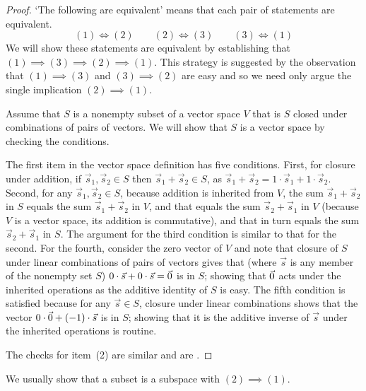 \begin{proof}
`The following are equivalent' means that each pair of 
statements are equivalent.
\begin{equation*}
  (1)\!\iff\!(2)
  \qquad
  (2)\!\iff\!(3)
  \qquad
  (3)\!\iff\!(1)
\end{equation*}
We will show these statements are equivalent by establishing that
\( (1)\implies (3)\implies (2)\implies (1)\).
This strategy is suggested by the observation that
\( (1)\implies (3) \) and \( (3)\implies (2) \) are easy and so we need only
argue the single implication \( (2)\implies (1) \).

Assume that \( S \) is a nonempty subset of a vector space
$V$ that is $S$ closed under combinations of pairs of vectors.
We will show that $S$ is a vector space by checking the conditions.

The first item in the vector space definition has five conditions.
First, for closure under addition, if
\( \vec{s}_1,\vec{s}_2\in S \) then \( \vec{s}_1+\vec{s}_2\in S \),
as \( \vec{s}_1+\vec{s}_2=1\cdot\vec{s}_1+1\cdot\vec{s}_2 \).
Second, for any \( \vec{s}_1,\vec{s}_2\in S \), because addition
is inherited from \( V \), the sum \( \vec{s}_1+\vec{s}_2 \)
in \( S \) equals the sum \( \vec{s}_1+\vec{s}_2 \)
in \( V \), and that equals the sum \( \vec{s}_2+\vec{s}_1 \) in
\( V \) (because $V$ is a vector space, its addition is commutative), 
and that in turn equals the sum \( \vec{s}_2+\vec{s}_1 \) in \( S \).
The argument for the third condition is similar to that for the second.
For the fourth, consider the zero vector of \( V \) and note that 
closure of $S$ under linear combinations of pairs of vectors gives that 
(where \( \vec{s} \) is any member of the nonempty set \( S \))
\( 0\cdot\vec{s}+0\cdot\vec{s}=\vec{0} \) is in $S$;
showing that \( \vec{0} \) acts under the inherited operations as the additive
identity of \( S \) is easy.
The fifth condition is satisfied because for any \( \vec{s}\in S \),
closure under linear combinations shows that the vector
\( 0\cdot\vec{0}+(-1)\cdot\vec{s} \) is in \( S \); showing that it is the
additive inverse of \( \vec{s} \) under the inherited operations is
routine.

The checks for item~(2) are similar and are 
.
\end{proof}

We usually show that a subset is a subspace with \( (2)\implies (1) \).

